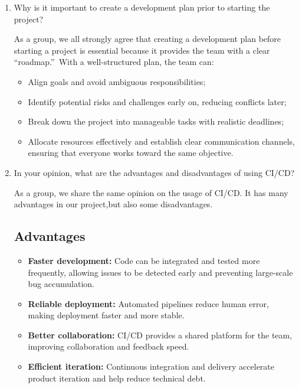\documentclass{article}
\begin{document}

 

\begin{enumerate}
    \item Why is it important to create a development plan prior to starting the
    project?

 As a group, we all strongly agree that creating a development plan before starting a project is essential because it provides the team with a clear \textquotedblleft roadmap.\textquotedblright\ With a well-structured plan, the team can:
\begin{itemize}
    \item Align goals and avoid ambiguous responsibilities;
    \item Identify potential risks and challenges early on, reducing conflicts later;
    \item Break down the project into manageable tasks with realistic deadlines;
    \item Allocate resources effectively and establish clear communication channels, ensuring that everyone works toward the same objective.
\end{itemize}
    \item In your opinion, what are the advantages and disadvantages of using
    CI/CD?
    
    As a group, we share the same opinion on the usage of CI/CD. It has many advantages in our project,but also some disadvantages.
\subsection*{Advantages}
\begin{itemize}
    \item \textbf{Faster development:} Code can be integrated and tested more frequently, allowing issues to be detected early and preventing large-scale bug accumulation.
    \item \textbf{Reliable deployment:} Automated pipelines reduce human error, making deployment faster and more stable.
    \item \textbf{Better collaboration:} CI/CD provides a shared platform for the team, improving collaboration and feedback speed.
    \item \textbf{Efficient iteration:} Continuous integration and delivery accelerate product iteration and help reduce technical debt.
\end{itemize}


\end{enumerate}
\end{document}
